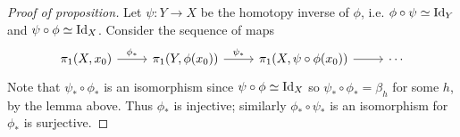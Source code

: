 \documentclass{../mathnotes}
\begin{document}
\begin{proof}[Proof of proposition]
    Let $\psi:Y\to X$ be the homotopy inverse of $\phi$, i.e. $\phi\circ\psi\simeq\operatorname{Id}_Y$ and $\psi\circ\phi\simeq\operatorname{Id}_X$.
    Consider the sequence of maps
    \begin{equation*}
        \begin{tikzcd}
            \pi_1(X,x_0)\arrow{r}{\phi_*}&\pi_1(Y,\phi(x_0))\arrow{r}{\psi_*}&\pi_1(X,\psi\circ\phi(x_0))\arrow{r}&\cdots
        \end{tikzcd}
    \end{equation*}
    Note that $\psi_*\circ\phi_*$ is an isomorphism since $\psi\circ\phi\simeq\operatorname{Id}_X$ so $\psi_*\circ\phi_*=\beta_h$
    for some $h$, by the lemma above. Thus $\phi_*$ is injective; similarly $\phi_*\circ\psi_*$ is an isomorphism
    for $\phi_*$ is surjective.
\end{proof}
\end{document}
